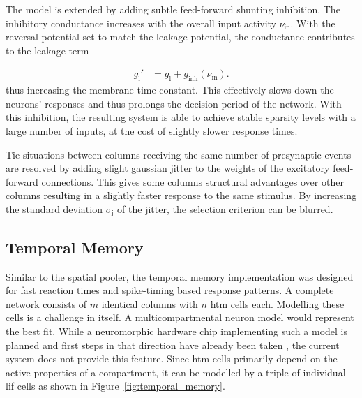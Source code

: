 The model is extended by adding subtle feed-forward shunting inhibition. The
inhibitory conductance increases with the overall input activity
$\nu_\text{in}$. With the reversal potential set to match the leakage potential,
the conductance contributes to the leakage term

\begin{align*}
	g_\text{l}' &= g_\text{l} + g_\text{inh}(\nu_\text{in}).
\end{align*}
%
thus increasing the membrane time constant. This effectively slows down the
neurons' responses and thus prolongs the decision period of the network. With
this inhibition, the resulting system is able to achieve stable sparsity
levels with a large number of inputs, at the cost of slightly slower response
times.

Tie situations between columns receiving the same number of presynaptic events
are resolved by adding slight gaussian jitter to the weights of the
excitatory feed-forward connections. This gives some columns structural
advantages over other columns resulting in a slightly faster response to the
same stimulus. By increasing the standard deviation $\sigma_\text{j}$ of the
jitter, the selection criterion can be blurred.


\subsection{Temporal Memory}

Similar to the spatial pooler, the temporal memory implementation was  designed
for fast reaction times and spike-timing based response patterns. A complete
network consists of $m$ identical columns with $n$ \gls{htm} cells each.
Modelling these cells is a challenge in itself. A multicompartmental neuron
model would represent the best fit. While a neuromorphic hardware chip
implementing such a model is planned and first steps in that direction have
already been taken \citep{millner2012development}, the current system does not
provide this feature. Since \gls{htm} cells primarily depend on the active
properties of a compartment, it can be modelled by a triple of individual
\gls{lif} cells as shown in Figure~\ref{fig:temporal_memory}.

